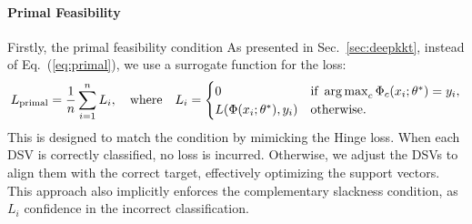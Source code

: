 \paragraph{Primal Feasibility}
Firstly, the primal feasibility condition   %
As presented in Sec.~\ref{sec:deepkkt}, instead of Eq.~(\ref{eq:primal}), we use a surrogate function %
for the loss: %
%
\begin{equation}\label{eq:two_step_loss}
L_{\text{primal}} = \frac{1}{n} \sum_{i=1}^n L_i, \quad \text{where} \quad
L_i = 
\begin{cases} 
0 & \text{if } \operatorname*{arg\,max}_c \Phi_c(x_i; \theta^*) = y_i, \\
L(\Phi(x_i; \theta^*), y_i) & \text{otherwise}.
\end{cases}
\end{equation}
%
This is designed to match the  condition by mimicking the Hinge loss. When each DSV is correctly classified, no loss is incurred. Otherwise, we adjust the DSVs to align them with the correct target, effectively optimizing the support vectors. This approach also implicitly enforces the complementary slackness condition, as $L_i$  confidence in the incorrect classification. %
%
%
%
